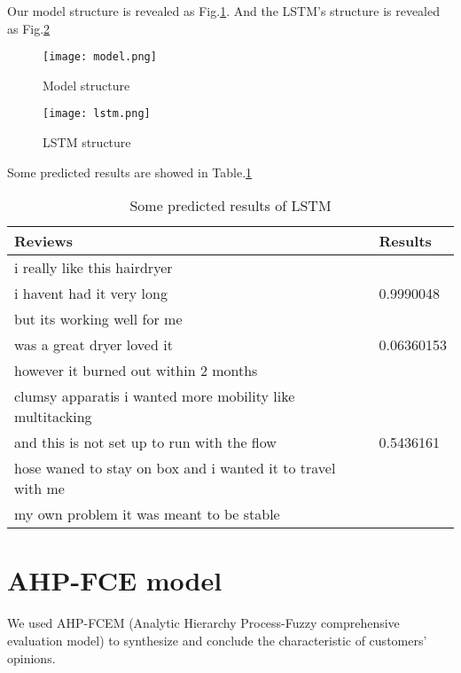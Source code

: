 \documentclass{mcmthesis}
\begin{document}
Our model structure is revealed as Fig.\ref{fig:model}. And the LSTM's structure is revealed as Fig.\ref{fig:lstm}



\begin{figure}[!h]
  \small
  \centering
  \texttt{[image: model.png]}
  \caption{Model structure} \label{fig:model}
\end{figure}


\begin{figure}[!h]
  \small
  \centering
  \texttt{[image: lstm.png]}
  \caption{LSTM structure} \label{fig:lstm}
\end{figure}


Some predicted results are showed in Table.\ref{tab:result}

\begin{table}[!h]
  \centering
  \caption{Some predicted results of LSTM} 
  \label{tab:result}
  \begin{tabular}{ll}
  \toprule[2.5pt]
  \textbf{Reviews}& \textbf{Results} \\
  \midrule[1.5pt]
  i really like this hairdryer  & \\ 
  i havent had it very long   &  0.9990048 \\
  but its working well for me  &  \\
  \midrule 
  was a great dryer loved it  & 0.06360153 \\
  however it burned out within 2 months &  \\
  \midrule 
  clumsy apparatis i wanted more mobility  like multitacking & \\ 
  and this is not set up to run with the flow &  0.5436161\\
   hose waned to stay on box and i wanted it to travel with me & \\
    my own problem  it was meant to be stable & \\

  \bottomrule
  \end{tabular}
  \end{table}



\section{AHP-FCE model}

We used AHP-FCEM (Analytic Hierarchy Process-Fuzzy comprehensive evaluation model) to synthesize and conclude the characteristic of customers’ opinions.
\end{document}
